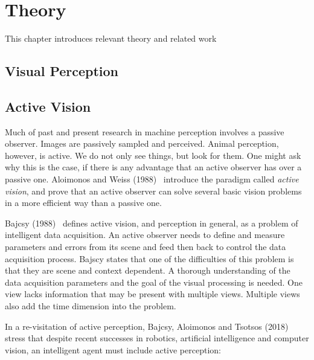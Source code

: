 \chapter{Theory}
\label{cha:theory}

This chapter introduces relevant theory and related work 



\section{Visual Perception}

\section{Active Vision}


Much of past and present research in machine perception involves a passive observer. Images are passively sampled and perceived. Animal perception, however, is active. We do not only see things, but look for them. One might ask why this is the case, if there is any advantage that an active observer has over a passive one. Aloimonos and Weiss (1988)~\cite{aloimonos_active_1988} introduce the paradigm called \textit{active vision}, and prove that an active observer can solve several basic vision problems in a more efficient way than a passive one.

Bajcsy (1988)~\cite{bajcsy_1988} defines active vision, and perception in general, as a problem of intelligent data acquisition. An active observer needs to define and measure parameters and errors from its scene and feed then back to control the data acquisition process. Bajscy states that one of the difficulties of this problem is that they are scene and context dependent. A thorough understanding of the data acquisition parameters and the goal of the visual processing is needed. One view lacks information that may be present with multiple views. Multiple views also add the time dimension into the problem.

In a re-visitation of active perception, Bajcsy, Aloimonos and Tsotsos (2018)~\cite{bajcsy_aloimonos_tsotsos_2018} stress that despite recent successes in robotics, artificial intelligence and computer vision, an intelligent agent must include active perception:

